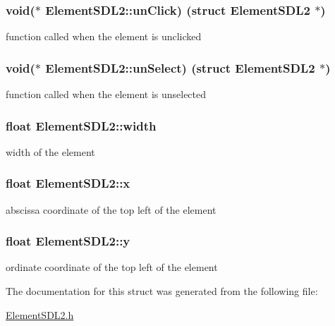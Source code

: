 \subsubsection[{\texorpdfstring{un\+Click}{unClick}}]{\setlength{\rightskip}{0pt plus 5cm}void($\ast$ Element\+S\+D\+L2\+::un\+Click) (struct {\bf Element\+S\+D\+L2} $\ast$)}\hypertarget{structElementSDL2_a0ad4094686063db36244b474fe42a336}{}\label{structElementSDL2_a0ad4094686063db36244b474fe42a336}
function called when the element is unclicked 
\subsubsection[{\texorpdfstring{un\+Select}{unSelect}}]{\setlength{\rightskip}{0pt plus 5cm}void($\ast$ Element\+S\+D\+L2\+::un\+Select) (struct {\bf Element\+S\+D\+L2} $\ast$)}\hypertarget{structElementSDL2_a8057ee0d19cdd60ec568076206ee0e12}{}\label{structElementSDL2_a8057ee0d19cdd60ec568076206ee0e12}
function called when the element is unselected 
\subsubsection[{\texorpdfstring{width}{width}}]{\setlength{\rightskip}{0pt plus 5cm}float Element\+S\+D\+L2\+::width}\hypertarget{structElementSDL2_a1dc0d58f7dfad658560111bd8d37a114}{}\label{structElementSDL2_a1dc0d58f7dfad658560111bd8d37a114}
width of the element 
\subsubsection[{\texorpdfstring{x}{x}}]{\setlength{\rightskip}{0pt plus 5cm}float Element\+S\+D\+L2\+::x}\hypertarget{structElementSDL2_a85c4f16793909cb2ab4fc3d1da0ad788}{}\label{structElementSDL2_a85c4f16793909cb2ab4fc3d1da0ad788}
abscissa coordinate of the top left of the element 
\subsubsection[{\texorpdfstring{y}{y}}]{\setlength{\rightskip}{0pt plus 5cm}float Element\+S\+D\+L2\+::y}\hypertarget{structElementSDL2_a07636d9e6dc09c88aaff9062b2db5278}{}\label{structElementSDL2_a07636d9e6dc09c88aaff9062b2db5278}
ordinate coordinate of the top left of the element 

The documentation for this struct was generated from the following file\+:\begin{DoxyCompactItemize}
\item 
\hyperlink{ElementSDL2_8h}{Element\+S\+D\+L2.\+h}\end{DoxyCompactItemize}
